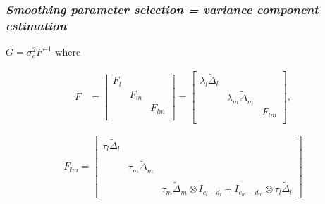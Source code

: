 \documentclass[12pt]{beamer}
\newcommand{\ms}{\scriptscriptstyle}
\begin{document}
\begin{frame}
\frametitle{\emph{\normalsize{Smoothing parameter selection = variance component estimation}}}

\vspace{0.2in}
$G = \sigma_{\ms e}^2 F^{-1}$ where

\begin{align*}
F &= \left[\begin{array}{ccc}
F_{\ms l} &&\\
&F_{\ms m} &\\
&& F_{\ms lm}\\
\end{array}\right]
 = \left[\begin{array}{ccc}
\lambda_l \tilde{\Delta}_l &&\\
&\lambda_m \tilde{\Delta}_m &\\
&& F_{\ms lm}\\
\end{array}\right],
\end{align*}
%

\begin{equation*}
 F_{\ms lm} = \left[\begin{array}{ccc}
\tau_l \tilde{\Delta}_l &&\\
&&\\
&\tau_m \tilde{\Delta}_m&\\
&&\\
&&\tau_m \tilde{\Delta}_m \otimes I_{\ms{c_l-d_l}} +  I_{\ms{c_m-d_m}} \otimes \tau_l \tilde{\Delta}_l \end{array}\right]
\end{equation*}


\end{frame}
\end{document}
